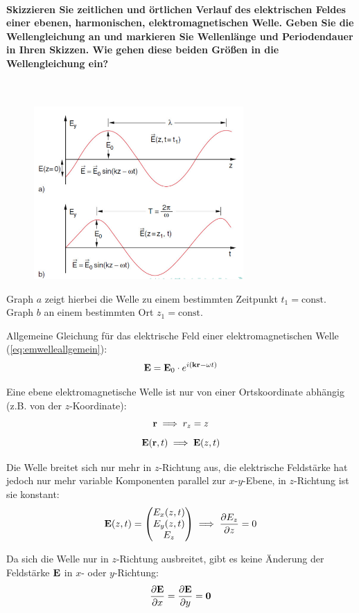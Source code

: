 \documentclass[a4paper, 11pt, ngerman, parskip=half-]{scrartcl}
\begin{document}
\paragraph{Skizzieren Sie zeitlichen und örtlichen Verlauf des elektrischen Feldes einer ebenen,
    harmonischen, elektromagnetischen Welle. Geben Sie die Wellengleichung an und markieren Sie
    Wellenlänge und Periodendauer in Ihren Skizzen. Wie gehen diese beiden Größen in die Wellengleichung
    ein?} ~

\begin{figure}[H]
    \centering
    \includegraphics[width=8cm]{image/13/2.png}
\end{figure}

Graph $a$ zeigt hierbei die Welle zu einem bestimmten Zeitpunkt $t_1 = \text{const.}$ Graph $b$ an einem bestimmten Ort $z_1 = \text{const.}$

Allgemeine Gleichung für das elektrische Feld einer elektromagnetischen Welle (\autoref{eq:emwelleallgemein}):
\[\vb{E} = \vb{E}_0 \cdot e^{i(\vb{kr} - \omega t)}\]

Eine ebene elektromagnetische Welle ist nur von einer Ortskoordinate abhängig (z.B. von der $z$-Koordinate):
\[\vb{r} \implies r_z = z\]
\[\vb{E}(\vb{r},t) \implies \vb{E}(z,t)\]

Die Welle breitet sich nur mehr in $z$-Richtung aus, die elektrische Feldstärke hat jedoch nur mehr variable Komponenten parallel zur $x$-$y$-Ebene, in $z$-Richtung ist sie konstant:
\[\vb{E}(z,t) = \begin{pmatrix}E_x(z,t) \\ E_y(z,t) \\ E_z \end{pmatrix} \implies \pdv{E_z}{z} = 0\]

Da sich die Welle nur in $z$-Richtung ausbreitet, gibt es keine Änderung der Feldstärke $\vb{E}$ in $x$- oder $y$-Richtung:
\[\pdv{\vb{E}}{x} = \pdv{\vb{E}}{y} = \vb{0}\]
\end{document}
